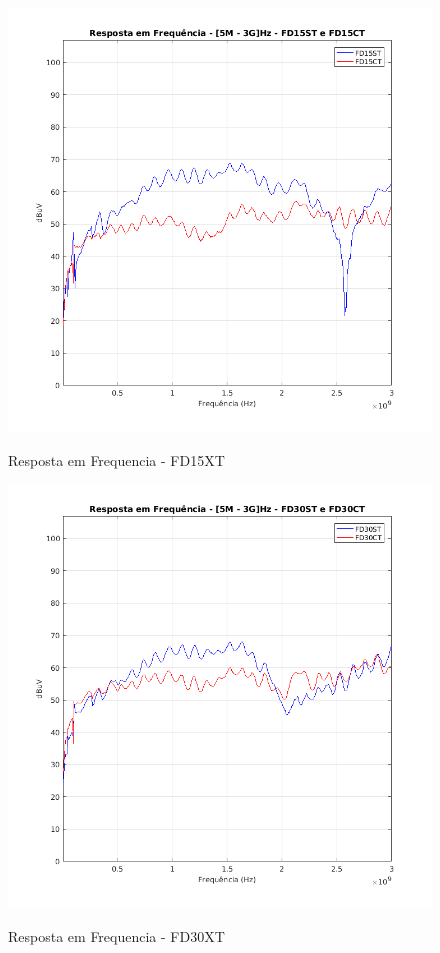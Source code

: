 \begin{figure}[H]
	\centering 
	\caption{Resposta em Frequencia - FD15XT}
	\includegraphics[scale=0.7]{./img/FD15XT}
	\label{fig:FD15XT}
\end{figure}

\begin{figure}[H]
	\centering 
	\caption{Resposta em Frequencia - FD30XT}
	\includegraphics[scale=0.7]{./img/FD30XT}
	\label{fig:FD30XT}
\end{figure}


